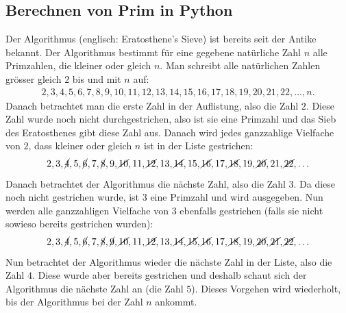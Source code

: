 \subsection{Berechnen von  Prim in Python}
Der Algorithmus  (englisch: Eratosthene's Sieve) ist bereits seit der Antike bekannt. Der Algorithmus bestimmt für eine gegebene natürliche Zahl $n$ alle Primzahlen, die kleiner oder gleich $n$. Man schreibt alle natürlichen Zahlen grösser gleich $2$ bis und mit $n$ auf:
\begin{align*}
	2, 3, 4, 5, 6, 7, 8, 9, 10, 11, 12, 13, 14, 15, 16, 17, 18, 19, 20, 21, 22, \ldots , n.
\end{align*}
Danach betrachtet man die erste Zahl in der Auflistung, also die Zahl $2$. Diese Zahl wurde noch nicht durchgestrichen, also ist sie eine Primzahl und das Sieb des Eratosthenes gibt diese Zahl aus. Danach wird jedes ganzzahlige Vielfache von $2$, dass kleiner oder gleich $n$ ist in der Liste gestrichen:
\begin{align*}
	2, 3, \cancel{4}, 5, \cancel{6}, 7, \cancel{8}, 9, \cancel{10}, 11, \cancel{12}, 13, \cancel{14}, 15, \cancel{16}, 17, \cancel{18}, 19, \cancel{20}, 21, \cancel{22}, \ldots
\end{align*}
Danach betrachtet der Algorithmus die nächste Zahl, also die Zahl $3$. Da diese noch nicht gestrichen wurde, ist $3$ eine Primzahl und wird ausgegeben. Nun werden alle ganzzahligen Vielfache von $3$ ebenfalls gestrichen (falls sie nicht sowieso bereits gestrichen wurden):
\begin{align*}
	2, 3, \cancel{4}, 5, \cancel{6}, 7, \cancel{8}, \cancel{9}, \cancel{10}, 11, \cancel{12}, 13, \cancel{14}, \cancel{15}, \cancel{16}, 17, \cancel{18}, 19, \cancel{20}, \cancel{21}, \cancel{22}, \ldots
\end{align*}
Nun betrachtet der Algorithmus wieder die nächste Zahl in der Liste, also die Zahl $4$. Diese wurde aber bereits gestrichen und deshalb schaut sich der Algorithmus die nächste Zahl an (die Zahl $5$). Dieses Vorgehen wird wiederholt, bis der Algorithmus bei der Zahl $n$ ankommt.
